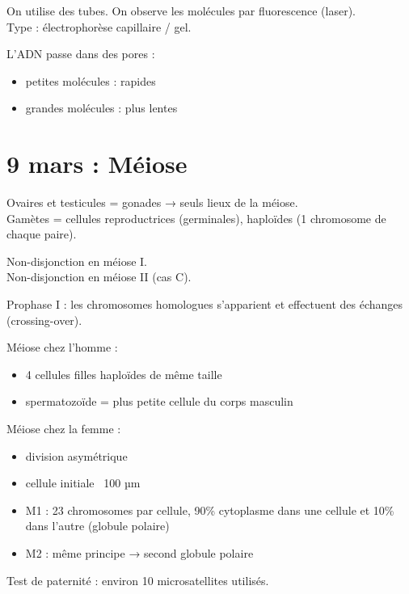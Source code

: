 \documentclass[11pt]{article}
\begin{document}
On utilise des tubes. On observe les molécules par fluorescence (laser).\\
Type : électrophorèse capillaire / gel.

L'ADN passe dans des pores :
\begin{itemize}
    \item petites molécules : rapides
    \item grandes molécules : plus lentes
\end{itemize}

\section*{9 mars : Méiose}

Ovaires et testicules = gonades → seuls lieux de la méiose.\\
Gamètes = cellules reproductrices (germinales), haploïdes (1 chromosome de chaque paire).

\vspace{0.3cm}

Non-disjonction en méiose I.\\
Non-disjonction en méiose II (cas C).

\vspace{0.3cm}

Prophase I : les chromosomes homologues s'apparient et effectuent des échanges (crossing-over).

\vspace{0.3cm}

Méiose chez l'homme :
\begin{itemize}
    \item 4 cellules filles haploïdes de même taille
    \item spermatozoïde = plus petite cellule du corps masculin
\end{itemize}

Méiose chez la femme :
\begin{itemize}
    \item division asymétrique
    \item cellule initiale ~100 µm
    \item M1 : 23 chromosomes par cellule, 90\% cytoplasme dans une cellule et 10\% dans l'autre (globule polaire)
    \item M2 : même principe → second globule polaire
\end{itemize}

Test de paternité : environ 10 microsatellites utilisés.
\end{document}
